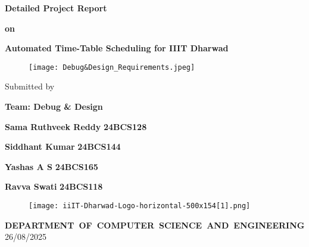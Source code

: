 \documentclass[12pt]{article}
\begin{document}
\begin{titlepage}
\clearpage
\newpage
\doublespacing

\begin{center}
\par {\large \textbf{Detailed Project Report}}\\
\end{center}

\begin{center}
	\par {\large \textbf{on}}
\end{center}

\begin{center}
{\Large \textbf{Automated Time-Table Scheduling for IIIT Dharwad}}
\end{center}
\begin{figure}[h]
    \begin{center}
    \texttt{[image: Debug\&Design\_Requirements.jpeg]}
    \end{center}
\end{figure}
{\small
\begin{center}
\par \small {Submitted by}
\par \Large \textbf{Team: Debug \& Design}
\par \Large \textbf{Sama Ruthveek Reddy} \textbf{24BCS128}
\par \Large \textbf{Siddhant Kumar} \textbf{24BCS144}
\par \Large \textbf{Yashas A S} \textbf{24BCS165}
\par \Large \textbf{Ravva Swati} \textbf{24BCS118}
\end{center}
}

\begin{figure}[h]
\begin{center}
\texttt{[image: iiIT-Dharwad-Logo-horizontal-500x154[1].png]} 
\end{center}
\end{figure}

\begin{center}
\par{\mbox {\small\textbf{DEPARTMENT OF COMPUTER SCIENCE AND ENGINEERING}}}
\\
26/08/2025
\end{center}
\end{titlepage}
\newpage
{}
\setcounter{page}{1}
\tableofcontents
\newpage
\listoffigures
\newpage
\listoftables
\end{document}

